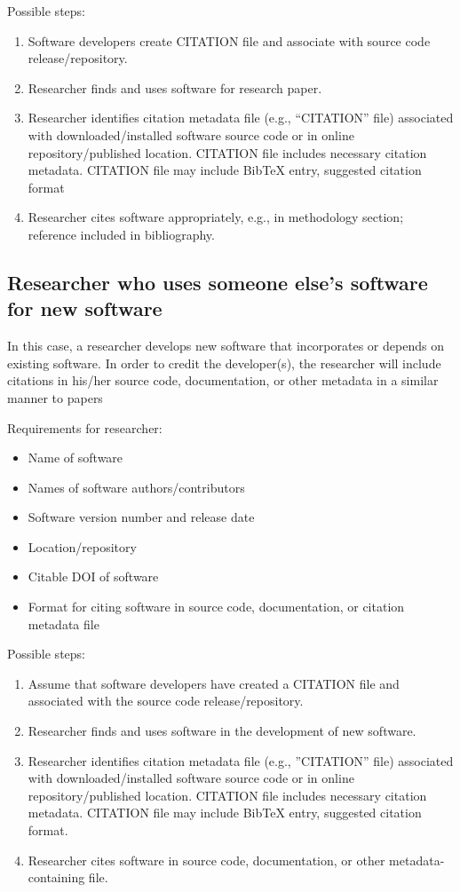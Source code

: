\documentclass[12pt, oneside]{amsart}
\begin{document}
Possible steps:
\begin{enumerate} \setcounter{enumi}{0}
\item Software developers create CITATION file and associate with source code release/repository.
\item Researcher finds and uses software for research paper.
\item Researcher identifies citation metadata file (e.g., ``CITATION'' file) associated with downloaded/installed software source code or in online repository/published location. CITATION file includes necessary citation metadata. CITATION file may include BibTeX entry, suggested citation format
\item Researcher cites software appropriately, e.g., in methodology section; reference included in bibliography.
\end{enumerate}

\subsection{Researcher who uses someone else's software for new software}

In this case, a researcher develops new software that incorporates or depends on existing software.
In order to credit the developer(s), the researcher will include citations in his/her source code, documentation, or other metadata in a similar manner to papers

Requirements for researcher:
\begin{itemize}
\item Name of software
\item Names of software authors/contributors
\item Software version number and release date
\item Location/repository
\item Citable DOI of software
\item Format for citing software in source code, documentation, or citation metadata file
\end{itemize}

Possible steps:
\begin{enumerate} \setcounter{enumi}{0}
\item Assume that software developers have created a CITATION file and associated with the source code release/repository.
\item Researcher finds and uses software in the development of new software.
\item Researcher identifies citation metadata file (e.g., ''CITATION'' file) associated with downloaded/installed software source code or in online repository/published location. CITATION file includes necessary citation metadata. CITATION file may include BibTeX entry, suggested citation format.
\item Researcher cites software in source code, documentation, or other metadata-containing file.
\end{enumerate}
\end{document}
